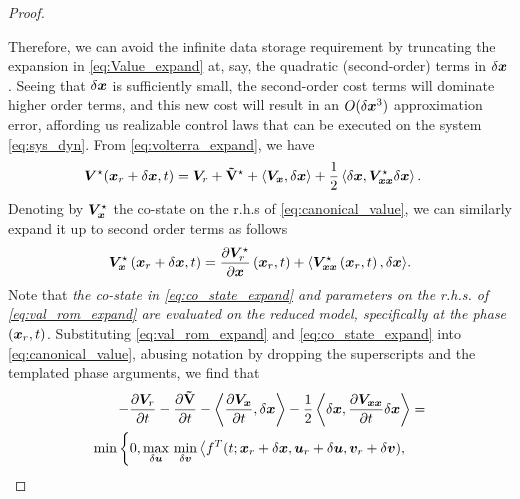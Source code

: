 \begin{proof}
\begin{itemize}
	\end{itemize}
	\item Therefore, we can avoid the infinite data storage requirement by truncating the expansion in \eqref{eq:Value_expand} at, say, the quadratic (second-order) terms in $\delta \bm{x}$. Seeing that $\delta \bm{x}$ is sufficiently small, the second-order cost terms will dominate higher order terms, and this new cost will result in an $O(\delta \bm{x}^3)$ approximation error, affording us realizable control laws that can be executed on the system \eqref{eq:sys_dyn}. From \eqref{eq:volterra_expand}, we have
	\begin{align}
		\valuefunc^\star(\state_r + \delta \state, t) &= \valuefunc_r + \costdiff^\star + \left\langle\valuefunc_{\state}, \delta \state \right\rangle +  \dfrac{1}{2} \left\langle \delta \state, \valuefunc^\star_{\state\state} \delta\state \right\rangle.
		\label{eq:val_rom_expand}
	\end{align}
	Denoting by $\bm{V}_{\bm{x}}^\star$ the co-state on the r.h.s of \eqref{eq:canonical_value}, we  can similarly expand it up to second order terms as follows
	\begin{align}
		\valuefunc_{\state}^\star\left(\state_r + \delta \state, t \right) = \dfrac{\partial \valuefunc^\star_r}{\partial \state}\left(\state_r , t \right) + \langle \valuefunc^\star_{\state\state}\left(\state_r , t \right), \delta \state \rangle.
		\label{eq:co_state_expand}
	\end{align}
	Note that \textit{the co-state in \eqref{eq:co_state_expand} and parameters on the r.h.s. of \eqref{eq:val_rom_expand} are evaluated on the reduced model, specifically at the phase $\left(\bm{x}_r, t\right)$}. Substituting \eqref{eq:val_rom_expand} and \eqref{eq:co_state_expand} into \eqref{eq:canonical_value}, abusing notation by dropping the superscripts and the templated phase arguments, we find that
	\begin{align}
		\begin{split} 
			-\frac{\partial \valuefunc_r}{\partial t} -\frac{\partial \costdiff}{\partial t} - \left\langle \dfrac{\partial\valuefunc_{\state}}{\partial t}, \delta\state \right \rangle -  \dfrac{1}{2} \left\langle \delta \state, \dfrac{\partial \valuefunc_{\state\state} }{\partial t}\delta\state \right \rangle &=  \\
			\min \left\{0,  
			\max_{\delta \control} \, \min_{\delta \disturb} \left\langle f^T(t; \state_r + \delta \state, \control_r + \delta \control,  \disturb_r + \delta \disturb), \right. \right. \\

\end{split}
\end{align}
\end{proof}

